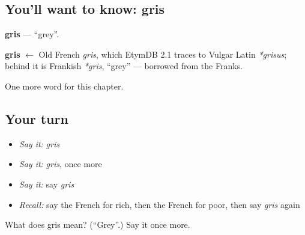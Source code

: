 \subsection*{You'll want to know: gris}
\textbf{gris} — \textquotedblleft{}grey\textquotedblright{}.

\begin{cousinweb}
\textbf{gris} $\leftarrow$ Old French \emph{gris}, which EtymDB 2.1 traces to Vulgar Latin \emph{*grisus}; behind it is Frankish \emph{*gris}, \textquotedblleft{}grey\textquotedblright{} — borrowed from the Franks.
\end{cousinweb}

\begin{grammarlens}[title={What you've built}]
One more word for this chapter.
\end{grammarlens}

\subsection*{Your turn}
\begin{itemize}
\raggedright
  \item \emph{Say it:} \emph{gris}
  \item \emph{Say it:} \emph{gris}, once more
  \item \emph{Say it:} say \emph{gris}
  \item \emph{Recall:} say the French for rich, then the French for poor, then say \emph{gris} again
\end{itemize}

\begin{tcolorbox}[breakable,colback=teal!4,colframe=teal!35!black,title={Before you move on}]
What does gris mean? (\textquotedblleft{}Grey\textquotedblright{}.) Say it once more.
\end{tcolorbox}
